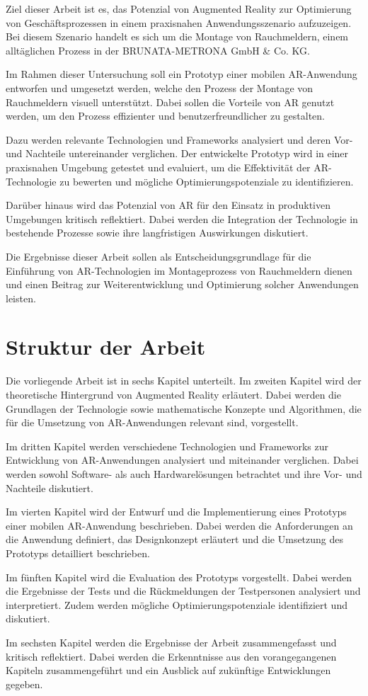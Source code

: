 Ziel dieser Arbeit ist es, das Potenzial von Augmented Reality zur Optimierung von Geschäftsprozessen in einem praxisnahen Anwendungsszenario aufzuzeigen. Bei diesem Szenario handelt es sich um die Montage von Rauchmeldern, einem alltäglichen Prozess in der BRUNATA-METRONA GmbH \& Co. KG.

Im Rahmen dieser Untersuchung soll ein Prototyp einer mobilen AR-Anwendung entworfen und umgesetzt werden, welche den Prozess der Montage von Rauchmeldern visuell unterstützt. Dabei sollen die Vorteile von AR genutzt werden, um den Prozess effizienter und benutzerfreundlicher zu gestalten.

Dazu werden relevante Technologien und Frameworks analysiert und deren Vor- und Nachteile untereinander verglichen. Der entwickelte Prototyp wird in einer praxisnahen Umgebung getestet und evaluiert, um die Effektivität der AR-Technologie zu bewerten und mögliche Optimierungspotenziale zu identifizieren.

Darüber hinaus wird das Potenzial von AR für den Einsatz in produktiven Umgebungen kritisch reflektiert. Dabei werden die Integration der Technologie in bestehende Prozesse sowie ihre langfristigen Auswirkungen diskutiert.

Die Ergebnisse dieser Arbeit sollen als Entscheidungsgrundlage für die Einführung von AR-Technologien im Montageprozess von Rauchmeldern dienen und einen Beitrag zur Weiterentwicklung und Optimierung solcher Anwendungen leisten.

\section{Struktur der Arbeit}

Die vorliegende Arbeit ist in sechs Kapitel unterteilt. Im zweiten Kapitel wird der theoretische Hintergrund von Augmented Reality erläutert. Dabei werden die Grundlagen der Technologie sowie mathematische Konzepte und Algorithmen, die für die Umsetzung von AR-Anwendungen relevant sind, vorgestellt.

Im dritten Kapitel werden verschiedene Technologien und Frameworks zur Entwicklung von AR-Anwendungen analysiert und miteinander verglichen. Dabei werden sowohl Software- als auch Hardwarelösungen betrachtet und ihre Vor- und Nachteile diskutiert.

Im vierten Kapitel wird der Entwurf und die Implementierung eines Prototyps einer mobilen AR-Anwendung beschrieben. Dabei werden die Anforderungen an die Anwendung definiert, das Designkonzept erläutert und die Umsetzung des Prototyps detailliert beschrieben.

Im fünften Kapitel wird die Evaluation des Prototyps vorgestellt. Dabei werden die Ergebnisse der Tests und die Rückmeldungen der Testpersonen analysiert und interpretiert. Zudem werden mögliche Optimierungspotenziale identifiziert und diskutiert.

Im sechsten Kapitel werden die Ergebnisse der Arbeit zusammengefasst und kritisch reflektiert. Dabei werden die Erkenntnisse aus den vorangegangenen Kapiteln zusammengeführt und ein Ausblick auf zukünftige Entwicklungen gegeben.


